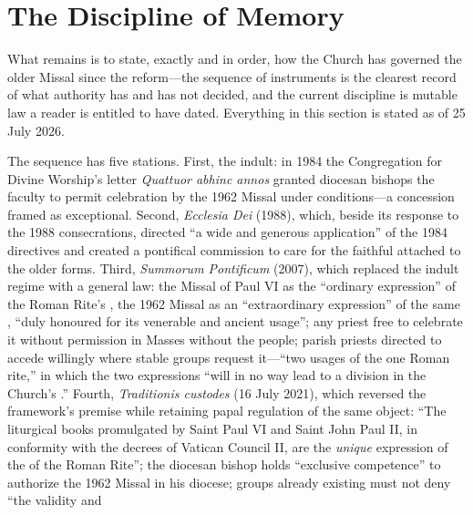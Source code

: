 \section{The Discipline of Memory}

What remains is to state, exactly and in order, how the Church has governed the older Missal since the reform---the sequence of instruments is the clearest record of what authority has and has not decided, and the current discipline is mutable law a reader is entitled to have dated. Everything in this section is stated as of 25 July 2026.

The sequence has five stations. First, the indult: in 1984 the Congregation for Divine Worship's letter \emph{Quattuor abhinc annos} granted diocesan bishops the faculty to permit celebration by the 1962 Missal under conditions---a concession framed as exceptional. Second, \emph{Ecclesia Dei} (1988), which, beside its response to the 1988 consecrations, directed ``a wide and generous application'' of the 1984 directives and created a pontifical commission to care for the faithful attached to the older forms. Third, \emph{Summorum Pontificum} (2007), which replaced the indult regime with a general law: the Missal of Paul VI as the ``ordinary expression'' of the Roman Rite's , the 1962 Missal as an ``extraordinary expression'' of the same , ``duly honoured for its venerable and ancient usage''; any priest free to celebrate it without permission in Masses without the people; parish priests directed to accede willingly where stable groups request it---``two usages of the one Roman rite,'' in which the two expressions ``will in no way lead to a division in the Church's .'' Fourth, \emph{Traditionis custodes} (16 July 2021), which reversed the framework's premise while retaining papal regulation of the same object: ``The liturgical books promulgated by Saint Paul VI and Saint John Paul II, in conformity with the decrees of Vatican Council II, are the \emph{unique} expression of the  of the Roman Rite''; the diocesan bishop holds ``exclusive competence'' to authorize the 1962 Missal in his diocese; groups already existing must not deny ``the validity and 